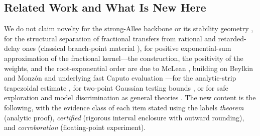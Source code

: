 \documentclass[mathematics,article,accept,pdftex,moreauthors]{Definitions/mdpi}
\begin{document}
\subsection*{Related Work and What Is New Here}

We do not claim novelty for the strong-Allee backbone or its stability geometry \cite{Wang2011}, for the structural separation of fractional transfers from rational and retarded-delay ones (classical branch-point material \cite{Matignon1996,Petras2011}), for positive exponential-sum approximation of the fractional kernel---the construction, the positivity of the weights, and the root-exponential order are due to McLean \cite{McLean2018}, building on Beylkin and Monz\'on \cite{Beylkin2005,Beylkin2010} and underlying fast Caputo evaluation \cite{Jiang2017}---for the analytic-strip trapezoidal estimate \cite{Trefethen2014}, for two-point Gaussian testing bounds \cite{Kay1998}, or for safe exploration and model discrimination as general theories \cite{Sui2015,Harirchi2018}. The new content is the following, with the evidence class of each item stated using the labels \emph{theorem} (analytic proof), \emph{certified} (rigorous interval enclosure with outward rounding), and \emph{corroboration} (floating-point experiment).
\end{document}
